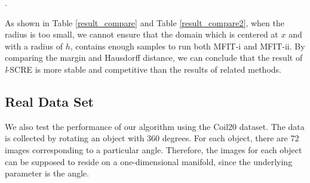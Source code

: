 \documentclass[aos,preprint]{imsart}
\theoremstyle{remark}
\begin{document}
\begin{table}[h]
\caption{The margin and Hausdorff between $\cal \hat{G}$ and $\mathcal M$ vary with $h$ for SCRE, {\it l}-SCRE, MFIT-i and MFIT-ii on the 2-dimensional sphere}.
\end{table}


As shown in Table \ref{result_compare} and Table \ref{result_compare2}, when the radius is too small, we cannot ensure that the domain which is centered at $x$ and with a radius of $h$, contains enough samples to run both MFIT-i and MFIT-ii. By comparing the margin and Hausdorff distance, we can conclude that the result of {\it l}-SCRE is more stable and competitive than the results of related methods.

\subsection{Real Data Set}
We also test the performance of our algorithm using the Coil20 \cite{Coil20} dataset. The data is collected by rotating an object with 360 degrees. For each object, there are 72 images corresponding to a particular angle. Therefore, the images for each object can be supposed to reside on a one-dimensional manifold, since the underlying parameter is the angle.
\end{document}
